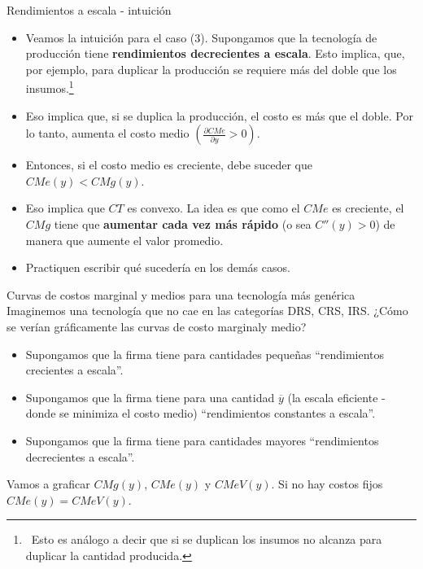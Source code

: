 \documentclass{beamer}
\newtheorem{prop}[thm]{Proposici\'on}
\theoremstyle{definition}
\begin{document}
\begin{frame}{Rendimientos a escala - intuición}
\begin{itemize}
\item Veamos la intuición para el caso (3). Supongamos que
la tecnología de producci\'{o}n tiene \textbf{rendimientos decrecientes a escala}. Esto
implica, que, por ejemplo, para duplicar la producci\'{o}n se requiere
más del doble que los insumos.\footnote{ \, Esto es análogo a decir que si se duplican los insumos no alcanza para duplicar la cantidad producida.} 

\item Eso implica que, si se duplica la
producci\'{o}n, el costo es más que el doble. Por lo tanto, aumenta el costo medio $(\frac{\partial CMe}{\partial y}>0)$. 
\item Entonces, si el costo medio es creciente, debe suceder que $CMe(y)<CMg(y)$. 
\item Eso implica que $CT$ es convexo. La idea es que como el $CMe$ es creciente, el $CMg$ tiene que \textbf{aumentar cada vez más rápido} (o sea $C''(y)>0$) de manera que aumente el valor promedio.
\item Practiquen escribir qué sucedería en los demás casos.
\end{itemize}
\end{frame}

    

\begin{frame}{\small Curvas de costos marginal y medios para una tecnología más genérica}
    Imaginemos una tecnología que no cae en las categorías DRS, CRS, IRS. ¿Cómo se verían gráficamente las curvas de costo marginaly medio?
    \begin{itemize}
        \item Supongamos que la firma tiene para cantidades pequeñas ``rendimientos crecientes a escala''.
        \item Supongamos que la firma tiene para una cantidad $\overline{y}$ (la escala eficiente - donde se minimiza el costo medio) ``rendimientos constantes a escala''.
        \item Supongamos que la firma tiene para cantidades mayores ``rendimientos decrecientes a escala''.
    \end{itemize}

    Vamos a graficar $CMg(y)$, $CMe(y)$ y $CMeV(y)$. Si no hay costos fijos $CMe(y)=CMeV(y)$.
\end{frame}
\end{document}
